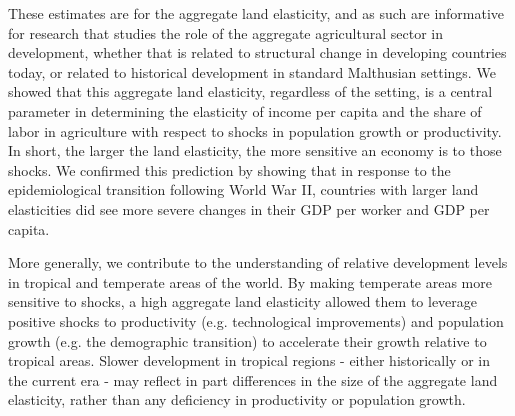 \documentclass[11pt]{article}
\begin{document}
These estimates are for the aggregate land elasticity, and as such are informative for research that studies the role of the aggregate agricultural sector in development, whether that is related to structural change in developing countries today, or related to historical development in standard Malthusian settings. We showed that this aggregate land elasticity, regardless of the setting, is a central parameter in determining the elasticity of income per capita and the share of labor in agriculture with respect to shocks in population growth or productivity. In short, the larger the land elasticity, the more sensitive an economy is to those shocks. We confirmed this prediction by showing that in response to the epidemiological transition following World War II, countries with larger land elasticities did see more severe changes in their GDP per worker and GDP per capita.

More generally, we contribute to the understanding of relative development levels in tropical and temperate areas of the world. By making temperate areas more sensitive to shocks, a high aggregate land elasticity allowed them to leverage positive shocks to productivity (e.g. technological improvements) and population growth (e.g. the demographic transition) to accelerate their growth relative to tropical areas. Slower development in tropical regions - either historically or in the current era - may reflect in part differences in the size of the aggregate land elasticity, rather than any deficiency in productivity or population growth. 

\newpage

\clearpage

\onehalfspacing
{\small


}

\clearpage
\end{document}
